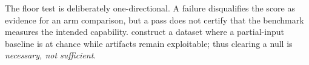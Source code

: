 The floor test is deliberately one-directional. A failure disqualifies the score as evidence for an arm comparison, but a pass does not certify that the benchmark measures the intended capability. \citet{feng2019misleading} construct a dataset where a partial-input baseline is at chance while artifacts remain exploitable; thus clearing a null is \emph{necessary, not sufficient}.
